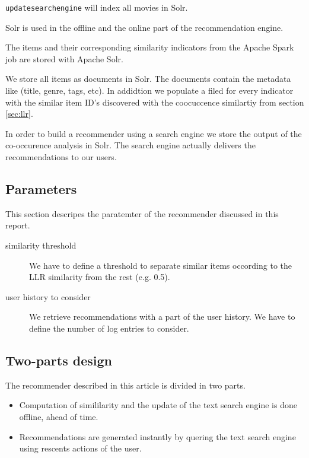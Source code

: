 \verb|updatesearchengine| will index all movies in Solr.

Solr is used in the offline and the online part of the recommendation engine.

The items and their corresponding similarity indicators from the Apache Spark job are stored with Apache Solr. 

We store all items as documents in Solr. The documents contain the metadata like (title, genre, tags, etc). In addidtion we populate a filed for every indicator with the similar item ID's discovered with the coocuccence similartiy from section \ref{sec:llr}.

In order to build a recommender using a search engine we store the output of the co-occurence analysis in Solr. The search engine actually delivers the recommendations to our users.

\subsection{Parameters}
\label{sec:parameters}

This section descripes the paratemter of the recommender discussed in this report.
\begin{description}
\item[similarity threshold] We have to define a threshold to separate similar items occording to the LLR similarity from the rest (e.g. 0.5).
\item[user history to consider] We retrieve recommendations with a part of the user history. We have to define the number of log entries to consider.
\end{description}

\subsection{Two-parts design}

The recommender described in this article is divided in two parts.
\begin{itemize}
\item Computation of simililarity and the update of the text search engine is done offline, ahead of time.
\item Recommendations are generated instantly by quering the text search engine using rescents actions of the user.
\end{itemize}
